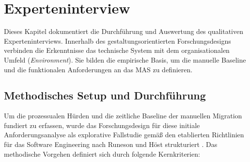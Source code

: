 \chapter{Experteninterview}
\label{ch:experteninterview}

Dieses Kapitel dokumentiert die Durchführung und Auswertung des qualitativen Experteninterviews. Innerhalb des gestaltungsorientierten Forschungsdesigns verbinden die Erkenntnisse das technische System mit dem organisationalen Umfeld (\textit{Environment}). Sie bilden die empirische Basis, um die manuelle Baseline und die funktionalen Anforderungen an das \ac{MAS} zu definieren.
\section{Methodisches Setup und Durchführung}
\label{subsec:methodisches_setup_experteninterview}
Um die prozessualen Hürden und die zeitliche Baseline der manuellen Migration fundiert zu erfassen, wurde das Forschungsdesign für diese initiale Anforderungsanalyse als explorative Fallstudie gemäß den etablierten Richtlinien für das Software Engineering nach Runeson und Höst strukturiert \parencite{runesonGuidelinesConductingReporting2009}. Das methodische Vorgehen definiert sich durch folgende Kernkriterien:

